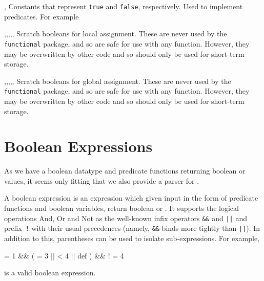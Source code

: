 \documentclass[oneside]{book}
\begin{document}
\begin{variable}{\cTrueBool,\cFalseBool}
Constants that represent \verb|true| and \verb|false|, respectively. Used to
implement predicates. For example
\begin{demohigh}
\boolVarIfTF {} {}
\boolVarIfTF {} {}
\end{demohigh}
\end{variable}

\begin{variable}{\lTmpaBool,\lTmpbBool,\lTmpcBool,\lTmpiBool,\lTmpjBool,\lTmpkBool}
Scratch booleans for local assignment. These are never used by
the \verb!functional! package, and so are safe for use with any
function. However, they may be overwritten by other
code and so should only be used for short-term storage.
\end{variable}

\begin{variable}{\gTmpaBool,\gTmpbBool,\gTmpcBool,\gTmpiBool,\gTmpjBool,\gTmpkBool}
Scratch booleans for global assignment. These are never used by
the \verb!functional! package, and so are safe for use with any
function. However, they may be overwritten by other
code and so should only be used for short-term storage.
\end{variable}

\section{Boolean Expressions}

As we have a boolean datatype and predicate functions returning
boolean  or  values, it seems only fitting
that we also provide a parser for .

A boolean expression is an expression which given input in the form
of predicate functions and boolean variables, return boolean
 or . It supports the logical operations And,
Or and Not as the well-known infix operators \verb|&&| and \verb"||" and
prefix~\verb|!| with their usual precedences (namely, \verb|&&| binds
more tightly than \verb"||"). In addition to this, parentheses can be
used to isolate sub-expressions. For example,
\begin{codehigh}
 = {1} &&
  (
     = {3} ||
     < {4} ||
     {def}
  ) &&
!  = {4}
\end{codehigh}
is a valid boolean expression.
\end{document}
